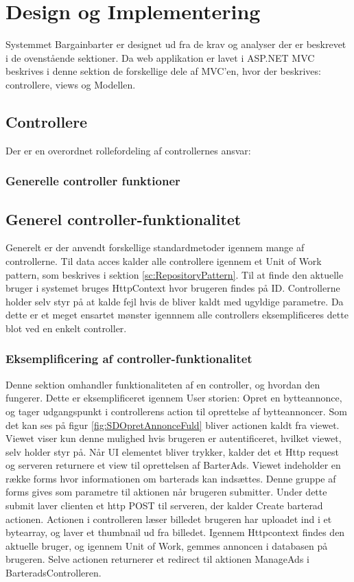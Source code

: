\chapter{Design og Implementering}
Systemmet Bargainbarter er designet ud fra de krav og analyser der er beskrevet i de ovenstående sektioner. Da web applikation er lavet i ASP.NET MVC beskrives i denne sektion de forskellige dele af MVC'en, hvor der beskrives: controllere, views og Modellen. 


\section{Controllere}
Der er en overordnet rollefordeling af controllernes ansvar: 




\subsection{Generelle controller funktioner}\label{sc:GenerelControl}

\section{Generel controller-funktionalitet}


Generelt er der anvendt forskellige standardmetoder igennem mange af controllerne. Til data acces kalder alle controllere igennem et Unit of Work pattern, som beskrives i sektion \ref{sc:RepositoryPattern}. Til at finde den aktuelle bruger i systemet bruges HttpContext hvor brugeren findes på ID. Controllerne holder selv styr på at kalde fejl hvis de bliver kaldt med ugyldige parametre. Da dette er et meget ensartet mønster igennnem alle controllers eksemplificeres dette blot ved en enkelt controller.

\subsection{Eksemplificering af controller-funktionalitet}
Denne sektion omhandler funktionaliteten af en controller, og hvordan den fungerer. Dette er eksemplificeret igennem User storien: Opret en bytteannonce, og tager udgangspunkt i controllerens action til oprettelse af bytteannoncer.
Som det kan ses på figur \ref{fig:SDOpretAnnonceFuld} bliver actionen kaldt fra viewet. Viewet viser kun denne mulighed hvis brugeren er autentificeret, hvilket viewet, selv holder styr på. Når UI elementet bliver trykker, kalder det et Http request og serveren returnere et view til oprettelsen af BarterAds. Viewet indeholder en række forms hvor informationen om barterads kan indsættes. Denne gruppe af forms gives som parametre til aktionen når brugeren submitter. Under dette submit laver clienten et http POST til serveren, der kalder Create barterad actionen. Actionen i controlleren læser billedet brugeren har uploadet ind i et bytearray, og laver et thumbnail ud fra billedet. Igennem Httpcontext findes den aktuelle bruger, og igennem Unit of Work, gemmes annoncen i databasen på brugeren. Selve actionen returnerer et redirect til aktionen ManageAds i BarteradsControlleren. 

